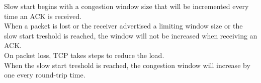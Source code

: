 Slow start begins with a congestion window size that will be incremented every time an ACK is received. \\
When a packet is lost or the receiver advertised a limiting window size or the slow start treshold is reached, the window will not be increased when receiving an ACK. \\
On packet loss, TCP takes steps to reduce the load. \\
When the slow start treshold is reached, the congestion window will increase by one every round-trip time.